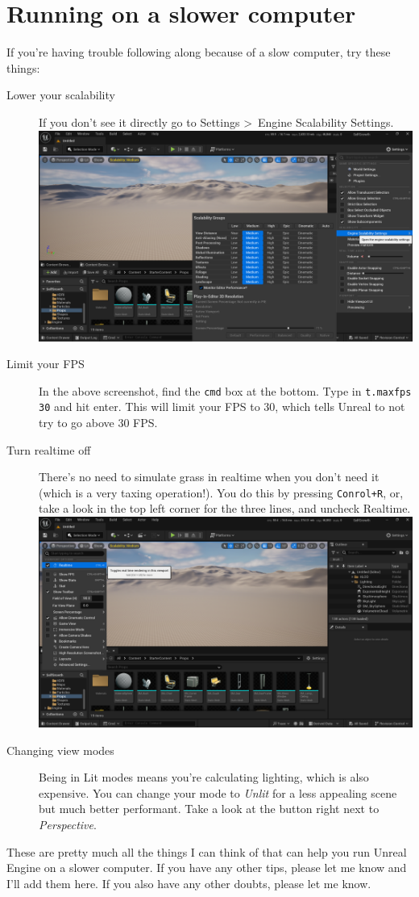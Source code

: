 \documentclass{article}
\begin{document}
\section{Running on a slower computer}
If you're having trouble following along because of a slow computer, try these things:
\begin{description}
    \item[Lower your scalability] If you don't see it directly go to Settings \textgreater\, Engine Scalability Settings. \\[10pt]\includegraphics[width=1\textwidth]{day2images/image005.png}
    \item[Limit your FPS] In the above screenshot, find the \verb|cmd| box at the bottom. Type in \verb|t.maxfps 30| and hit enter. This will limit your FPS to 30, which tells Unreal to not try to go above 30 FPS.
    \item[Turn realtime off] There's no need to simulate grass in realtime when you don't need it (which is a very taxing operation!). You do this by pressing \verb|Conrol+R|, or, take a look in the top left corner for the three lines, and uncheck Realtime. \\[10pt]\includegraphics[width=1\textwidth]{day2images/image006.png}
    \item[Changing view modes] Being in Lit modes means you're calculating lighting, which is also expensive. You can change your mode to \emph{Unlit} for a less appealing scene but much better performant. Take a look at the button right next to \emph{Perspective}.
\end{description}

These are pretty much all the things I can think of that can help you run Unreal Engine on a slower computer. If you have any other tips, please let me know and I'll add them here. If you also have any other doubts, please let me know.
\end{document}
